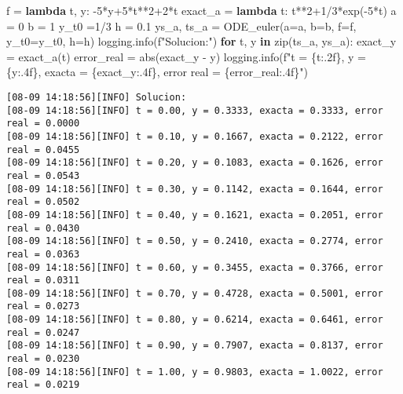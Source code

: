 \documentclass[
  letterpaper,
  DIV=11,
  numbers=noendperiod]{scrartcl}
\newenvironment{Shaded}{\begin{snugshade}}{\end{snugshade}}
\newcommand{\BuiltInTok}[1]{\textcolor[rgb]{0.00,0.23,0.31}{#1}}
\newcommand{\ControlFlowTok}[1]{\textcolor[rgb]{0.00,0.23,0.31}{\textbf{#1}}}
\newcommand{\DecValTok}[1]{\textcolor[rgb]{0.68,0.00,0.00}{#1}}
\newcommand{\FloatTok}[1]{\textcolor[rgb]{0.68,0.00,0.00}{#1}}
\newcommand{\KeywordTok}[1]{\textcolor[rgb]{0.00,0.23,0.31}{\textbf{#1}}}
\newcommand{\NormalTok}[1]{\textcolor[rgb]{0.00,0.23,0.31}{#1}}
\newcommand{\OperatorTok}[1]{\textcolor[rgb]{0.37,0.37,0.37}{#1}}
\newcommand{\SpecialCharTok}[1]{\textcolor[rgb]{0.37,0.37,0.37}{#1}}
\newcommand{\SpecialStringTok}[1]{\textcolor[rgb]{0.13,0.47,0.30}{#1}}
\begin{document}
\begin{Shaded}
\begin{Highlighting}[]
\NormalTok{f }\OperatorTok{=} \KeywordTok{lambda}\NormalTok{ t, y: }\OperatorTok{{-}}\DecValTok{5}\OperatorTok{*}\NormalTok{y}\OperatorTok{+}\DecValTok{5}\OperatorTok{*}\NormalTok{t}\OperatorTok{**}\DecValTok{2}\OperatorTok{+}\DecValTok{2}\OperatorTok{*}\NormalTok{t}
\NormalTok{exact\_a }\OperatorTok{=} \KeywordTok{lambda}\NormalTok{ t: t}\OperatorTok{**}\DecValTok{2}\OperatorTok{+}\DecValTok{1}\OperatorTok{/}\DecValTok{3}\OperatorTok{*}\NormalTok{exp(}\OperatorTok{{-}}\DecValTok{5}\OperatorTok{*}\NormalTok{t)}
\NormalTok{a }\OperatorTok{=} \DecValTok{0}
\NormalTok{b }\OperatorTok{=} \DecValTok{1}
\NormalTok{y\_t0 }\OperatorTok{=}\DecValTok{1}\OperatorTok{/}\DecValTok{3}
\NormalTok{h }\OperatorTok{=} \FloatTok{0.1}
\NormalTok{ys\_a, ts\_a }\OperatorTok{=}\NormalTok{ ODE\_euler(a}\OperatorTok{=}\NormalTok{a, b}\OperatorTok{=}\NormalTok{b, f}\OperatorTok{=}\NormalTok{f, y\_t0}\OperatorTok{=}\NormalTok{y\_t0, h}\OperatorTok{=}\NormalTok{h)}
\NormalTok{logging.info(}\SpecialStringTok{f"Solucion:"}\NormalTok{)}
\ControlFlowTok{for}\NormalTok{ t, y }\KeywordTok{in} \BuiltInTok{zip}\NormalTok{(ts\_a, ys\_a):}
\NormalTok{    exact\_y }\OperatorTok{=}\NormalTok{ exact\_a(t)}
\NormalTok{    error\_real }\OperatorTok{=} \BuiltInTok{abs}\NormalTok{(exact\_y }\OperatorTok{{-}}\NormalTok{ y)}
\NormalTok{    logging.info(}\SpecialStringTok{f"t = }\SpecialCharTok{\{}\NormalTok{t}\SpecialCharTok{:.2f\}}\SpecialStringTok{, y = }\SpecialCharTok{\{}\NormalTok{y}\SpecialCharTok{:.4f\}}\SpecialStringTok{, exacta = }\SpecialCharTok{\{}\NormalTok{exact\_y}\SpecialCharTok{:.4f\}}\SpecialStringTok{, error real = }\SpecialCharTok{\{}\NormalTok{error\_real}\SpecialCharTok{:.4f\}}\SpecialStringTok{"}\NormalTok{)}
\end{Highlighting}
\end{Shaded}

\begin{verbatim}
[08-09 14:18:56][INFO] Solucion:
[08-09 14:18:56][INFO] t = 0.00, y = 0.3333, exacta = 0.3333, error real = 0.0000
[08-09 14:18:56][INFO] t = 0.10, y = 0.1667, exacta = 0.2122, error real = 0.0455
[08-09 14:18:56][INFO] t = 0.20, y = 0.1083, exacta = 0.1626, error real = 0.0543
[08-09 14:18:56][INFO] t = 0.30, y = 0.1142, exacta = 0.1644, error real = 0.0502
[08-09 14:18:56][INFO] t = 0.40, y = 0.1621, exacta = 0.2051, error real = 0.0430
[08-09 14:18:56][INFO] t = 0.50, y = 0.2410, exacta = 0.2774, error real = 0.0363
[08-09 14:18:56][INFO] t = 0.60, y = 0.3455, exacta = 0.3766, error real = 0.0311
[08-09 14:18:56][INFO] t = 0.70, y = 0.4728, exacta = 0.5001, error real = 0.0273
[08-09 14:18:56][INFO] t = 0.80, y = 0.6214, exacta = 0.6461, error real = 0.0247
[08-09 14:18:56][INFO] t = 0.90, y = 0.7907, exacta = 0.8137, error real = 0.0230
[08-09 14:18:56][INFO] t = 1.00, y = 0.9803, exacta = 1.0022, error real = 0.0219
\end{verbatim}
\end{document}
